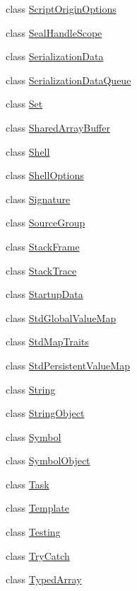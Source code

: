 \begin{DoxyCompactItemize}
\item 
class \hyperlink{classv8_1_1_script_origin_options}{Script\+Origin\+Options}
\item 
class \hyperlink{classv8_1_1_seal_handle_scope}{Seal\+Handle\+Scope}
\item 
class \hyperlink{classv8_1_1_serialization_data}{Serialization\+Data}
\item 
class \hyperlink{classv8_1_1_serialization_data_queue}{Serialization\+Data\+Queue}
\item 
class \hyperlink{classv8_1_1_set}{Set}
\item 
class \hyperlink{classv8_1_1_shared_array_buffer}{Shared\+Array\+Buffer}
\item 
class \hyperlink{classv8_1_1_shell}{Shell}
\item 
class \hyperlink{classv8_1_1_shell_options}{Shell\+Options}
\item 
class \hyperlink{classv8_1_1_signature}{Signature}
\item 
class \hyperlink{classv8_1_1_source_group}{Source\+Group}
\item 
class \hyperlink{classv8_1_1_stack_frame}{Stack\+Frame}
\item 
class \hyperlink{classv8_1_1_stack_trace}{Stack\+Trace}
\item 
class \hyperlink{classv8_1_1_startup_data}{Startup\+Data}
\item 
class \hyperlink{classv8_1_1_std_global_value_map}{Std\+Global\+Value\+Map}
\item 
class \hyperlink{classv8_1_1_std_map_traits}{Std\+Map\+Traits}
\item 
class \hyperlink{classv8_1_1_std_persistent_value_map}{Std\+Persistent\+Value\+Map}
\item 
class \hyperlink{classv8_1_1_string}{String}
\item 
class \hyperlink{classv8_1_1_string_object}{String\+Object}
\item 
class \hyperlink{classv8_1_1_symbol}{Symbol}
\item 
class \hyperlink{classv8_1_1_symbol_object}{Symbol\+Object}
\item 
class \hyperlink{classv8_1_1_task}{Task}
\item 
class \hyperlink{classv8_1_1_template}{Template}
\item 
class \hyperlink{classv8_1_1_testing}{Testing}
\item 
class \hyperlink{classv8_1_1_try_catch}{Try\+Catch}
\item 
class \hyperlink{classv8_1_1_typed_array}{Typed\+Array}

\end{DoxyCompactItemize}
